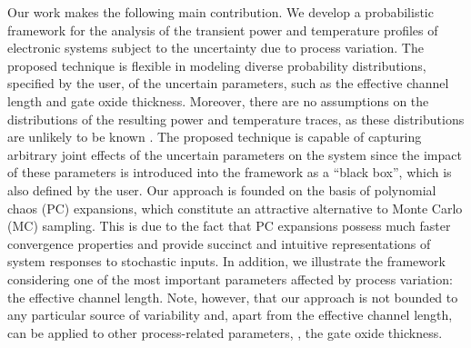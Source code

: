 
Our work makes the following main contribution.
We develop a probabilistic framework for the analysis of the transient power and temperature profiles of electronic systems subject to the uncertainty due to process variation.
The proposed technique is flexible in modeling diverse probability distributions, specified by the user, of the uncertain parameters, such as the effective channel length and gate oxide thickness.
Moreover, there are no assumptions on the distributions of the resulting power and temperature traces, as these distributions are unlikely to be known \apriori.
The proposed technique is capable of capturing arbitrary joint effects of the uncertain parameters on the system since the impact of these parameters is introduced into the framework as a ``black box'', which is also defined by the user.
Our approach is founded on the basis of polynomial chaos (PC) expansions, which constitute an attractive alternative to Monte Carlo (MC) sampling.
This is due to the fact that PC expansions possess much faster convergence properties and provide succinct and intuitive representations of system responses to stochastic inputs.
In addition, we illustrate the framework considering one of the most important parameters affected by process variation: the effective channel length.
Note, however, that our approach is not bounded to any particular source of variability and, apart from the effective channel length, can be applied to other process-related parameters, \eg, the gate oxide thickness.
